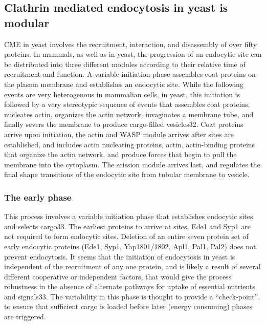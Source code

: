 		\subsection{Clathrin mediated endocytosis in yeast is modular}
		CME in yeast involves the recruitment, interaction, and disassembly of over fifty proteins. In mammals, as well as in yeast, the progression of an endocytic site can be distributed into three different modules according to their relative time of recruitment and function. A variable initiation phase assembles coat proteins on the plasma membrane and establishes an endocytic site. While the following events are very heterogenous in mammalian cells, in yeast, this initiation is followed by a very stereotypic sequence of events that assembles coat proteins, nucleates actin, organizes the actin network, invaginates a membrane tube, and finally severs the membrane to produce cargo-filled vesicles32. Coat proteins arrive upon initiation, the actin and WASP module arrives after sites are established, and includes actin nucleating proteins, actin, actin-binding proteins that organize the actin network, and produce forces that begin to pull the membrane into the cytoplasm. The scission module arrives last, and regulates the final shape transitions of the endocytic site from tubular membrane to vesicle. 


			\subsubsection{The early phase}
			This process involves a variable initiation phase that establishes endocytic sites and selects cargo33. The earliest proteins to arrive at sites, Ede1 and Syp1 are not required to form endocytic sites. Deletion of an entire seven protein set of early endocytic proteins (Ede1, Syp1, Yap1801/1802, Apl1, Pal1, Pal2) does not prevent endocytosis. It seems that the initiation of endocytosis in yeast is independent of the recruitment of any one protein, and is likely a result of several different cooperative or independent factors, that would give the process robustness in the absence of alternate pathways for uptake of essential nutrients and signals33. The variability in this phase is thought to provide a “check-point”, to ensure that sufficient cargo is loaded before later (energy consuming) phases are triggered. 
			
